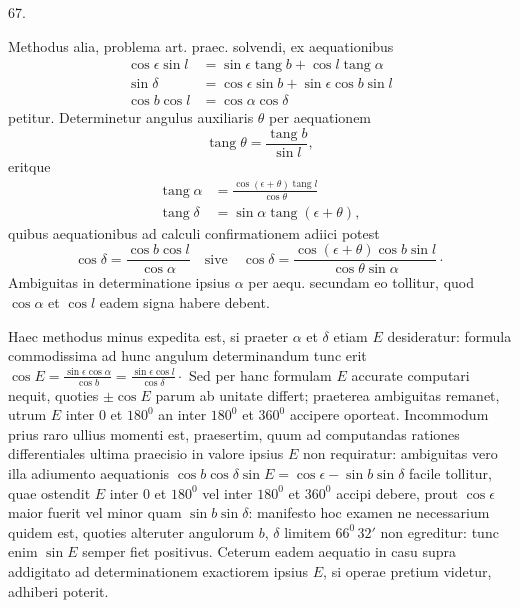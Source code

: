 \par\medskip
\hypertarget{native-086-article067}{}
\begin{center}67.\end{center}
Methodus alia, problema art. praec. solvendi, ex aequationibus\HistoricalNoteEight{Handschriftliche Bemerkung:]
\[
\begin{aligned}
\sin\alpha\cos\delta&=-\sin\epsilon\sin b+\cos\epsilon\cos b\sin l\\[.35em]
\cos\alpha\cos\delta&=\cos b\cos l\\[.35em]
\sin\delta&=\cos\epsilon\sin b+\sin\epsilon\cos b\sin l.
\end{aligned}
\]
}
\[
\begin{aligned}
\cos\epsilon\sin l&=\sin\epsilon\operatorname{tang}b+\cos l\operatorname{tang}\alpha\\[.4em]
\sin\delta&=\cos\epsilon\sin b+\sin\epsilon\cos b\sin l\\[.4em]
\cos b\cos l&=\cos\alpha\cos\delta
\end{aligned}
\]
petitur. Determinetur angulus auxiliaris $\theta$ per aequationem
\[
\operatorname{tang}\theta=\frac{\operatorname{tang}b}{\sin l},
\]
eritque
\[
\begin{aligned}
\operatorname{tang}\alpha&=\frac{\cos(\epsilon+\theta)\operatorname{tang}l}{\cos\theta}\\[.6em]
\operatorname{tang}\delta&=\sin\alpha\operatorname{tang}(\epsilon+\theta),
\end{aligned}
\]
quibus aequationibus ad calculi confirmationem adiici potest
\[
\cos\delta=\frac{\cos b\cos l}{\cos\alpha}\quad\text{sive}\quad
\cos\delta=\frac{\cos(\epsilon+\theta)\cos b\sin l}{\cos\theta\sin\alpha}\cdot
\]
Ambiguitas in determinatione ipsius $\alpha$ per aequ. secundam eo tollitur, quod $\cos\alpha$ et $\cos l$ eadem signa habere debent.

Haec methodus minus expedita est, si praeter $\alpha$ et $\delta$ etiam $E$ desideratur: formula commodissima ad hunc angulum determinandum tunc erit $\cos E=\frac{\sin\epsilon\cos\alpha}{\cos b}=\frac{\sin\epsilon\cos l}{\cos\delta}\cdot$ Sed per hanc formulam $E$ accurate computari nequit, quoties $\pm\cos E$ parum ab unitate differt; praeterea ambiguitas remanet, utrum $E$ inter $0$ et $180^0$ an inter $180^0$ et $360^0$ accipere oporteat. Incommodum prius raro ullius momenti est, praesertim, quum ad computandas rationes differentiales ultima praecisio in valore ipsius $E$ non requiratur: ambiguitas vero illa adiumento aequationis $\cos b\cos\delta\sin E=\cos\epsilon-\sin b\sin\delta$ facile tollitur, quae ostendit $E$ inter $0$ et $180^0$ vel inter $180^0$ et $360^0$ accipi debere, prout $\cos\epsilon$ maior fuerit vel minor quam $\sin b\sin\delta$: manifesto hoc examen ne necessarium quidem est, quoties alteruter angulorum $b$, $\delta$ limitem $66^0\,32'$ non egreditur: tunc enim $\sin E$ semper fiet positivus. Ceterum eadem aequatio in casu supra addigitato ad determinationem exactiorem ipsius $E$, si operae pretium videtur, adhiberi poterit.
